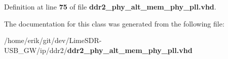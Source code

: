 Definition at line {\bf 75} of file {\bf ddr2\+\_\+phy\+\_\+alt\+\_\+mem\+\_\+phy\+\_\+pll.\+vhd}.



The documentation for this class was generated from the following file\+:\begin{DoxyCompactItemize}
\item 
/home/erik/git/dev/\+Lime\+S\+D\+R-\/\+U\+S\+B\+\_\+\+G\+W/ip/ddr2/{\bf ddr2\+\_\+phy\+\_\+alt\+\_\+mem\+\_\+phy\+\_\+pll.\+vhd}\end{DoxyCompactItemize}
